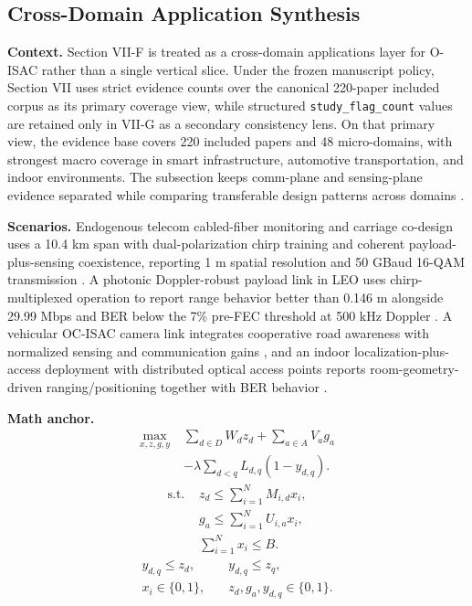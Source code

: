 \documentclass[lettersize,journal]{IEEEtran}
\begin{document}
\subsection{Cross-Domain Application Synthesis}

\textbf{Context.} Section VII-F is treated as a cross-domain applications layer for O-ISAC rather than a single vertical slice. Under the frozen manuscript policy, Section VII uses strict evidence counts over the canonical 220-paper included corpus as its primary coverage view, while structured \texttt{study\_flag\_count} values are retained only in VII-G as a secondary consistency lens. On that primary view, the evidence base covers 220 included papers and 48 micro-domains, with strongest macro coverage in smart infrastructure, automotive transportation, and indoor environments. The subsection keeps comm-plane and sensing-plane evidence separated while comparing transferable design patterns across domains \cite{O_ISAC_074,O_ISAC_164,O_ISAC_187}.

\textbf{Scenarios.} Endogenous telecom cabled-fiber monitoring and carriage co-design uses a 10.4 km span with dual-polarization chirp training and coherent payload-plus-sensing coexistence, reporting 1 m spatial resolution and 50 GBaud 16-QAM transmission \cite{O_ISAC_074}. A photonic Doppler-robust payload link in LEO uses chirp-multiplexed operation to report range behavior better than 0.146 m alongside 29.99 Mbps and BER below the 7\% pre-FEC threshold at 500 kHz Doppler \cite{O_ISAC_187}. A vehicular OC-ISAC camera link integrates cooperative road awareness with normalized sensing and communication gains \cite{O_ISAC_164}, and an indoor localization-plus-access deployment with distributed optical access points reports room-geometry-driven ranging/positioning together with BER behavior \cite{O_ISAC_011,O_ISAC_108}.

\textbf{Math anchor.}
\begin{equation}
\begin{split}
\max_{x,z,g,y}\;& \sum_{d \in D} W_d z_d + \sum_{a \in A} V_a g_a\\
&- \lambda \sum_{d<q} L_{d,q}(1-y_{d,q}).
\end{split}
\end{equation}
\begin{equation}
\begin{split}
\text{s.t. } &z_d \le \sum_{i=1}^{N} M_{i,d}x_i,\\
&g_a \le \sum_{i=1}^{N} U_{i,a}x_i,\\
&\sum_{i=1}^{N}x_i \le B.
\end{split}
\end{equation}
\begin{equation}
\begin{split}
y_{d,q}\le z_d,\quad &y_{d,q}\le z_q,\\
x_i \in \{0,1\},\quad &z_d,g_a,y_{d,q}\in\{0,1\}.
\end{split}
\end{equation}
\end{document}
